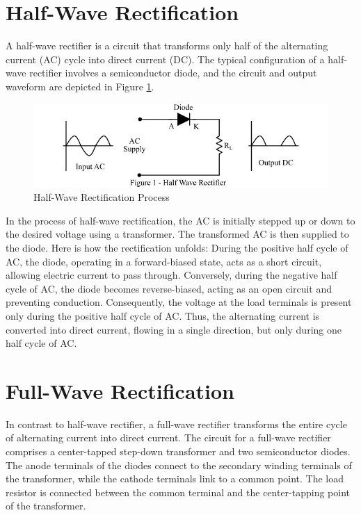 \documentclass[12pt,a4paper]{book}
\begin{document}
\section{Half-Wave Rectification}
A half-wave rectifier is a circuit that transforms only half of the alternating current (AC) cycle into direct current (DC). The typical configuration of a half-wave rectifier involves a semiconductor diode, and the circuit and output waveform are depicted in Figure \ref{fig:image1}.

\begin{figure}[h]
  \centering
  \includegraphics[width=13cm]{image1.png}
  \caption{Half-Wave Rectification Process}
  \label{fig:image1}
\end{figure}

In the process of half-wave rectification, the AC is initially stepped up or down to the desired voltage using a transformer. The transformed AC is then supplied to the diode. Here is how the rectification unfolds: During the positive half cycle of AC, the diode, operating in a forward-biased state, acts as a short circuit, allowing electric current to pass through. Conversely, during the negative half cycle of AC, the diode becomes reverse-biased, acting as an open circuit and preventing conduction. Consequently, the voltage at the load terminals is present only during the positive half cycle of AC. Thus, the alternating current is converted into direct current, flowing in a single direction, but only during one half cycle of AC.

\section{Full-Wave Rectification}
In contrast to half-wave rectifier, a full-wave rectifier transforms the entire cycle of alternating current into direct current. The circuit for a full-wave rectifier comprises a center-tapped step-down transformer and two semiconductor diodes. The anode terminals of the diodes connect to the secondary winding terminals of the transformer, while the cathode terminals link to a common point. The load resistor is connected between the common terminal and the center-tapping point of the transformer.
\end{document}
